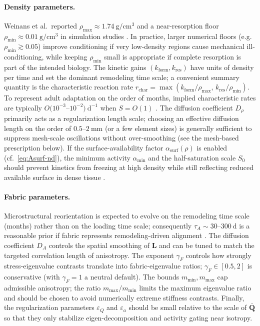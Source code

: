 \paragraph{Density parameters.}
Weinans et al.\ reported $\rho_{\max}\approx 1.74~\mathrm{g/cm^3}$ and a near-resorption floor $\rho_{\min}\approx 0.01~\mathrm{g/cm^3}$ in simulation studies \cite{Weinans1992_BehaviorAdaptiveBoneRemodeling}.
In practice, larger numerical floors (e.g.\ $\rho_{\min}\gtrsim 0.05$) improve conditioning if very low-density regions cause mechanical ill-conditioning, while keeping $\rho_{\min}$ small is appropriate if complete resorption is part of the intended biology.
The kinetic gains $(k_{\mathrm{form}},k_{\mathrm{res}})$ have units of density per time and set the dominant remodeling time scale; a convenient summary quantity is the characteristic reaction rate $r_{\mathrm{char}}=\max(k_{\mathrm{form}}/\rho_{\max},\,k_{\mathrm{res}}/\rho_{\min})$.
To represent adult adaptation on the order of months, implied characteristic rates are typically $O(10^{-3}$--$10^{-2})~\mathrm{d^{-1}}$ when $S=O(1)$ \cite{Robling2006}.
The diffusion coefficient $D_\rho$ primarily acts as a regularization length scale; choosing an effective diffusion length on the order of $0.5$--$2~\mathrm{mm}$ (or a few element sizes) is generally sufficient to suppress mesh-scale oscillations without over-smoothing (see the mesh-based prescription below).
If the surface-availability factor $\alpha_{\mathrm{surf}}(\rho)$ is enabled (cf.\ \eqref{eq:Asurf-nd}), the minimum activity $\alpha_{\min}$ and the half-saturation scale $S_0$ should prevent kinetics from freezing at high density while still reflecting reduced available surface in dense tissue \cite{Pivonka2013_InfluenceBoneSurfaceAvailability}.

\paragraph{Fabric parameters.}
Microstructural reorientation is expected to evolve on the remodeling time scale (months) rather than on the loading time scale; consequently $\tau_A\sim 30$--$300~\mathrm{d}$ is a reasonable prior if fabric represents remodeling-driven alignment \cite{Robling2006}.
The diffusion coefficient $D_A$ controls the spatial smoothing of $\mathbf{L}$ and can be tuned to match the targeted correlation length of anisotropy.
The exponent $\gamma_F$ controls how strongly stress-eigenvalue contrasts translate into fabric-eigenvalue ratios; $\gamma_F\in[0.5,2]$ is conservative (with $\gamma_F=1$ a neutral default).
The bounds $m_{\min},m_{\max}$ cap admissible anisotropy; the ratio $m_{\max}/m_{\min}$ limits the maximum eigenvalue ratio and should be chosen to avoid numerically extreme stiffness contrasts.
Finally, the regularization parameters $\varepsilon_Q$ and $\varepsilon_a$ should be small relative to the scale of $\bar{\mathbf{Q}}$ so that they only stabilize eigen-decomposition and activity gating near isotropy.

